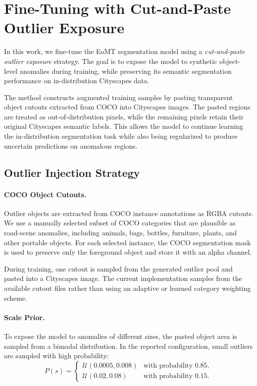 \section{Fine-Tuning with Cut-and-Paste Outlier Exposure}
\label{sec:finetuning}

In this work, we fine-tune the EoMT segmentation model using a
\textit{cut-and-paste outlier exposure} strategy. The goal is to expose the model
to synthetic object-level anomalies during training, while preserving its
semantic segmentation performance on in-distribution Cityscapes data.

The method constructs augmented training samples by pasting transparent object
cutouts extracted from COCO into Cityscapes images. The pasted regions are treated
as out-of-distribution pixels, while the remaining pixels retain their original
Cityscapes semantic labels. This allows the model to continue learning the
in-distribution segmentation task while also being regularized to produce
uncertain predictions on anomalous regions.

\subsection{Outlier Injection Strategy}

\paragraph{COCO Object Cutouts.}
Outlier objects are extracted from COCO instance annotations as RGBA cutouts. We
use a manually selected subset of COCO categories that are plausible as road-scene
anomalies, including animals, bags, bottles, furniture, plants, and other
portable objects. For each selected instance, the COCO segmentation mask is used
to preserve only the foreground object and store it with an alpha channel.

During training, one cutout is sampled from the generated outlier pool and pasted
into a Cityscapes image. The current implementation samples from the available
cutout files rather than using an adaptive or learned category weighting scheme.

\paragraph{Scale Prior.}
To expose the model to anomalies of different sizes, the pasted object area is
sampled from a bimodal distribution. In the reported configuration, small
outliers are sampled with high probability:
\begin{equation}
P(s) =
\begin{cases}
\mathcal{U}(0.0005, 0.008) & \text{with probability } 0.85, \\
\mathcal{U}(0.02, 0.08) & \text{with probability } 0.15.
\end{cases}
\end{equation}

